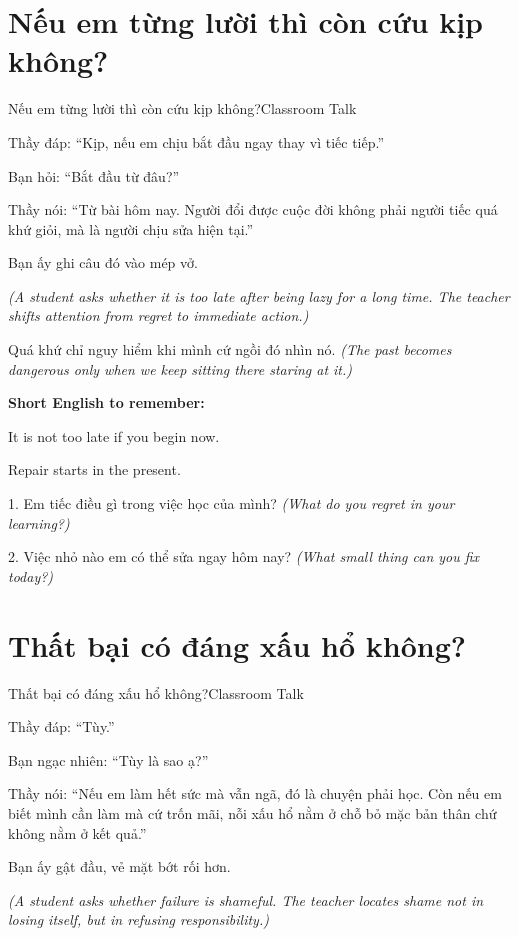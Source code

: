\section{Nếu em từng lười thì còn cứu kịp không?}
\begin{truyen}{Nếu em từng lười thì còn cứu kịp không?}{Classroom Talk}

Thầy đáp: ``Kịp, nếu em chịu bắt đầu ngay thay vì tiếc tiếp.''

Bạn hỏi: ``Bắt đầu từ đâu?''

Thầy nói: ``Từ bài hôm nay. Người đổi được cuộc đời không phải người tiếc quá khứ giỏi, mà là người chịu sửa hiện tại.''

Bạn ấy ghi câu đó vào mép vở.

\textit{(A student asks whether it is too late after being lazy for a long time. The teacher shifts attention from regret to immediate action.)}
\end{truyen}

\begin{baihoc}
Quá khứ chỉ nguy hiểm khi mình cứ ngồi đó nhìn nó.
\textit{(The past becomes dangerous only when we keep sitting there staring at it.)}
\end{baihoc}

\begin{ghinhoanh}
\textbf{Short English to remember:}

It is not too late if you begin now.

Repair starts in the present.
\end{ghinhoanh}

\begin{tuhocnhanh}
1. Em tiếc điều gì trong việc học của mình? \textit{(What do you regret in your learning?)}

2. Việc nhỏ nào em có thể sửa ngay hôm nay? \textit{(What small thing can you fix today?)}
\end{tuhocnhanh}
\ngancach

\section{Thất bại có đáng xấu hổ không?}
\begin{truyen}{Thất bại có đáng xấu hổ không?}{Classroom Talk}

Thầy đáp: ``Tùy.''

Bạn ngạc nhiên: ``Tùy là sao ạ?''

Thầy nói: ``Nếu em làm hết sức mà vẫn ngã, đó là chuyện phải học. Còn nếu em biết mình cần làm mà cứ trốn mãi, nỗi xấu hổ nằm ở chỗ bỏ mặc bản thân chứ không nằm ở kết quả.''

Bạn ấy gật đầu, vẻ mặt bớt rối hơn.

\textit{(A student asks whether failure is shameful. The teacher locates shame not in losing itself, but in refusing responsibility.)}
\end{truyen}

